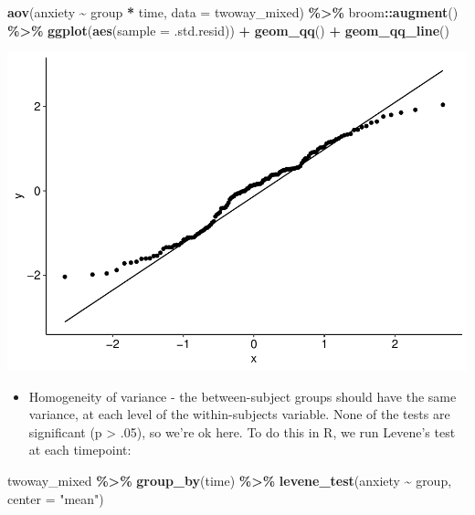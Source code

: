 \documentclass[
]{book}
\newenvironment{Shaded}{\begin{snugshade}}{\end{snugshade}}
\newcommand{\AttributeTok}[1]{\textcolor[rgb]{0.13,0.29,0.53}{#1}}
\newcommand{\FunctionTok}[1]{\textcolor[rgb]{0.13,0.29,0.53}{\textbf{#1}}}
\newcommand{\NormalTok}[1]{#1}
\newcommand{\SpecialCharTok}[1]{\textcolor[rgb]{0.81,0.36,0.00}{\textbf{#1}}}
\newcommand{\StringTok}[1]{\textcolor[rgb]{0.31,0.60,0.02}{#1}}
\providecommand{\tightlist}{%
  \setlength{\itemsep}{0pt}\setlength{\parskip}{0pt}}
\begin{document}
\begin{Shaded}
\begin{Highlighting}[]
\FunctionTok{aov}\NormalTok{(anxiety }\SpecialCharTok{\textasciitilde{}}\NormalTok{ group }\SpecialCharTok{*}\NormalTok{ time, }\AttributeTok{data =}\NormalTok{ twoway\_mixed) }\SpecialCharTok{\%\textgreater{}\%}
\NormalTok{  broom}\SpecialCharTok{::}\FunctionTok{augment}\NormalTok{() }\SpecialCharTok{\%\textgreater{}\%}
  \FunctionTok{ggplot}\NormalTok{(}\FunctionTok{aes}\NormalTok{(}\AttributeTok{sample =}\NormalTok{ .std.resid)) }\SpecialCharTok{+}
  \FunctionTok{geom\_qq}\NormalTok{() }\SpecialCharTok{+}
  \FunctionTok{geom\_qq\_line}\NormalTok{()}
\end{Highlighting}
\end{Shaded}

\includegraphics{_main_files/figure-latex/unnamed-chunk-243-1.pdf}

\begin{itemize}
\tightlist
\item
  Homogeneity of variance - the between-subject groups should have the same variance, at each level of the within-subjects variable. None of the tests are significant (p \textgreater{} .05), so we're ok here. To do this in R, we run Levene's test at each timepoint:
\end{itemize}

\begin{Shaded}
\begin{Highlighting}[]
\NormalTok{twoway\_mixed }\SpecialCharTok{\%\textgreater{}\%}
  \FunctionTok{group\_by}\NormalTok{(time) }\SpecialCharTok{\%\textgreater{}\%}
  \FunctionTok{levene\_test}\NormalTok{(anxiety }\SpecialCharTok{\textasciitilde{}}\NormalTok{ group, }\AttributeTok{center =} \StringTok{"mean"}\NormalTok{)}
\end{Highlighting}
\end{Shaded}
\end{document}
